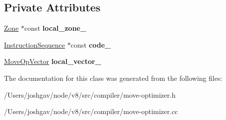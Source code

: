 \subsection*{Private Attributes}
\begin{DoxyCompactItemize}
\item 
\hyperlink{classv8_1_1internal_1_1_zone}{Zone} $\ast$const {\bfseries local\+\_\+zone\+\_\+}\hypertarget{classv8_1_1internal_1_1compiler_1_1_move_optimizer_afd3dedf464d6f325079380eb89314b74}{}\label{classv8_1_1internal_1_1compiler_1_1_move_optimizer_afd3dedf464d6f325079380eb89314b74}

\item 
\hyperlink{classv8_1_1internal_1_1compiler_1_1_instruction_sequence}{Instruction\+Sequence} $\ast$const {\bfseries code\+\_\+}\hypertarget{classv8_1_1internal_1_1compiler_1_1_move_optimizer_a3a59ba065d0c47c4914081719621411d}{}\label{classv8_1_1internal_1_1compiler_1_1_move_optimizer_a3a59ba065d0c47c4914081719621411d}

\item 
\hyperlink{classv8_1_1internal_1_1_zone_vector}{Move\+Op\+Vector} {\bfseries local\+\_\+vector\+\_\+}\hypertarget{classv8_1_1internal_1_1compiler_1_1_move_optimizer_a834a09d3787d831331a762059e3626ad}{}\label{classv8_1_1internal_1_1compiler_1_1_move_optimizer_a834a09d3787d831331a762059e3626ad}

\end{DoxyCompactItemize}


The documentation for this class was generated from the following files\+:\begin{DoxyCompactItemize}
\item 
/\+Users/joshgav/node/v8/src/compiler/move-\/optimizer.\+h\item 
/\+Users/joshgav/node/v8/src/compiler/move-\/optimizer.\+cc\end{DoxyCompactItemize}
